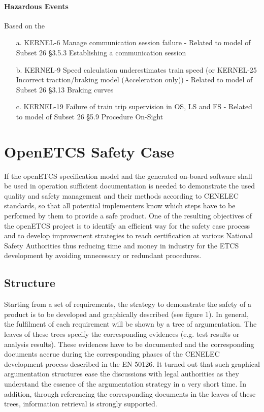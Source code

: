 \documentclass{template/openetcs_report}
\begin{document}
\subsubsection{Hazardous Events}

Based on the 
\begin{itemize}
\item [a.] KERNEL-6  Manage communication session failure - Related to model of Subset 26 §3.5.3 Establishing a communication session
\item [b.] KERNEL-9  Speed calculation underestimates train speed (or KERNEL-25  Incorrect traction/braking model (Acceleration only)) - Related to model of Subset 26 §3.13 Braking curves
\item [c.] KERNEL-19  Failure of train trip supervision in OS, LS and FS - Related to model of Subset 26 §5.9 Procedure On-Sight
\end{itemize}



\chapter{OpenETCS Safety Case}

If the openETCS specification model and the generated on-board software shall be used in operation sufficient documentation is needed to demonstrate the used quality and safety management and their methods according to CENELEC standards, so that all potential implementers know which steps have to be performed by them to provide a safe product. 
One of the resulting objectives of the openETCS project is to identify an efficient way for the safety case process and to develop improvement strategies to reach certification at various National Safety Authorities thus reducing time and money  in industry for the ETCS development by avoiding unnecessary or redundant procedures. 



\section{Structure}

Starting from a set of requirements, the strategy to demonstrate the safety of a product is to be developed and graphically described (see figure 1). In general, the fulfilment of each requirement will be shown by a tree of argumentation. The leaves of these trees specify the corresponding evidences (e.g. test results or analysis results). These evidences have to be documented and the corresponding documents accrue during the corresponding phases of the CENELEC development process described in the EN 50126.
It turned out that such graphical argumentation structures ease the discussions with legal authorities as they understand the essence of the argumentation strategy in a very short time. In addition, through referencing the corresponding documents in the leaves of these trees, information retrieval is strongly supported.
\end{document}
